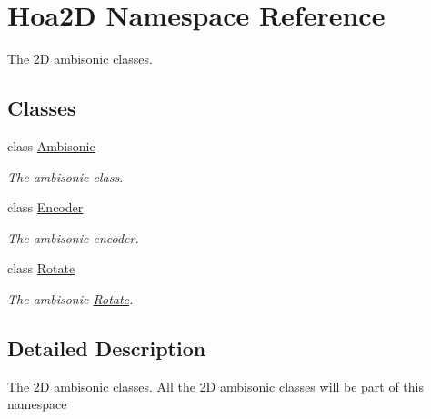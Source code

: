 \hypertarget{namespace_hoa2_d}{\section{Hoa2\-D Namespace Reference}
\label{namespace_hoa2_d}
}


The 2\-D ambisonic classes.  


\subsection*{Classes}
\begin{DoxyCompactItemize}
\item 
class \hyperlink{class_hoa2_d_1_1_ambisonic}{Ambisonic}
\begin{DoxyCompactList}\small\item\em The ambisonic class. \end{DoxyCompactList}\item 
class \hyperlink{class_hoa2_d_1_1_encoder}{Encoder}
\begin{DoxyCompactList}\small\item\em The ambisonic encoder. \end{DoxyCompactList}\item 
class \hyperlink{class_hoa2_d_1_1_rotate}{Rotate}
\begin{DoxyCompactList}\small\item\em The ambisonic \hyperlink{class_hoa2_d_1_1_rotate}{Rotate}. \end{DoxyCompactList}\end{DoxyCompactItemize}


\subsection{Detailed Description}
The 2\-D ambisonic classes. All the 2\-D ambisonic classes will be part of this namespace 